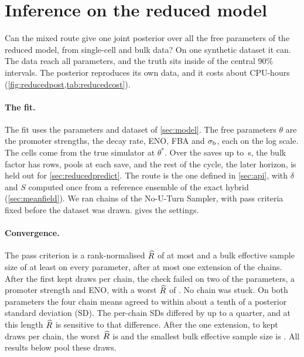 \section{Inference on the reduced model}
\label{sec:reduced}

Can the mixed route give one joint posterior over all the free parameters of the
reduced model, from single-cell and bulk data? On one synthetic dataset it can. The
data reach all  parameters, and the truth sits inside 
of the  central 90\% intervals. The posterior reproduces its own data,
and it costs about  CPU-hours (\cref{fig:reducedpost,tab:reducedcost}).

\paragraph{The fit.} The fit uses the parameters and dataset of \cref{sec:model}. The free
parameters $\theta$ are the  promoter strengths, the decay rate, ENO, FBA
and $\sigma_{\mathrm{b}}$, each on the log scale. The  cells come from the true simulator
at $\theta^\ast$. Over the  saves up to \,s, the bulk factor
has  rows,  pools at each save, and the rest of the cycle, the later horizon, is held out for
\cref{sec:reducedpredict}. The route is the one defined in \cref{sec:api}, with $\delta$
and $S$ computed once from a reference ensemble of the exact hybrid
(\cref{sec:meanfield}). We ran  chains of the No-U-Turn Sampler, with
pass criteria fixed before the dataset was drawn.  gives the settings.

\paragraph{Convergence.} The pass criterion is a rank-normalised $\widehat{R}$ of at most
 and a bulk effective sample size of at least  on
every parameter, after at most one extension of the chains. After the first
 kept draws per chain, the check failed on two of the
 parameters, a promoter strength and ENO, with a worst $\widehat{R}$ of
. No chain was stuck. On both parameters the four chain means agreed
to within about a tenth of a posterior standard deviation (SD). The per-chain SDs
differed by up to a quarter, and at this length $\widehat{R}$ is sensitive to that difference.
After the one extension, to  kept draws per chain, the worst $\widehat{R}$
is  and the smallest bulk effective sample size is .
All results below pool these  draws.

